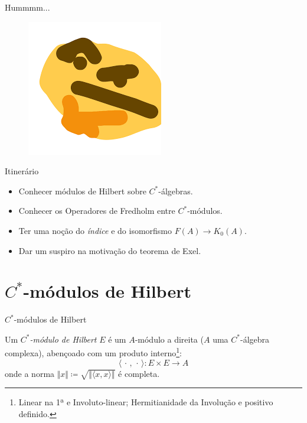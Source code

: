 \documentclass[9pt, compress]{beamer}
\begin{document}
{\begin{frame}{Hummmm...}
    \begin{figure}[h]
        \includegraphics[width=0.45\linewidth]{hummm.png}
    \end{figure}
\end{frame}

\begin{frame}{Itinerário}
    \begin{itemize}
        \item Conhecer módulos de Hilbert sobre $C^*$-álgebras.\pause
        \item Conhecer os Operadores de Fredholm entre $C^*$-módulos.\pause
        \item Ter uma noção do \textit{índice} e do isomorfismo $F(A)\longrightarrow K_0(A)$. \pause
        \item Dar um suspiro na motivação do teorema de Exel.
    \end{itemize}
\end{frame}

\section{\texorpdfstring{\ensuremath{C^*}}{C*}-módulos de Hilbert}
\begin{frame}{\texorpdfstring{\ensuremath{C^*}}{C*}-módulos de Hilbert}
\nocite{wegge1993k}
    \begin{definicao}
        Um \textit{$C^*$-módulo de Hilbert} $E$ é um $A$-módulo a direita ($A$ uma $C^*$-álgebra complexa), \pause abençoado com um produto interno\footnote{Linear na 1ª e Involuto-linear; Hermitianidade da Involução e positivo definido.}:
        \begin{equation}
            \langle \,\cdot\,, \,\cdot\,\rangle : E \times E \longrightarrow A
        \end{equation}   
        onde a norma $\Vert x\Vert \coloneqq \sqrt{ \Vert\langle x, x\rangle\Vert}$ é completa.
    \end{definicao}


\end{frame}}
\end{document}
